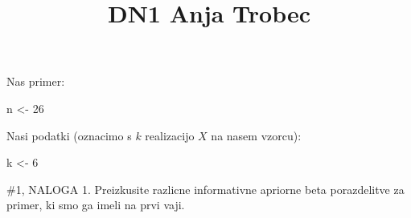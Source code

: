 \documentclass[
]{article}
\title{DN1 Anja Trobec}
\author{}
\date{\vspace{-2.5em}}
\newenvironment{Shaded}{\begin{snugshade}}{\end{snugshade}}
\newcommand{\DecValTok}[1]{\textcolor[rgb]{0.00,0.00,0.81}{#1}}
\newcommand{\NormalTok}[1]{#1}
\newcommand{\OtherTok}[1]{\textcolor[rgb]{0.56,0.35,0.01}{#1}}
\begin{document}
\maketitle

Nas primer:

\begin{Shaded}
\begin{Highlighting}[]
\NormalTok{n }\OtherTok{\textless{}{-}} \DecValTok{26}
\end{Highlighting}
\end{Shaded}

Nasi podatki (oznacimo s \(k\) realizacijo \(X\) na nasem vzorcu):

\begin{Shaded}
\begin{Highlighting}[]
\NormalTok{k }\OtherTok{\textless{}{-}} \DecValTok{6}
\end{Highlighting}
\end{Shaded}

\#1, NALOGA 1. Preizkusite razlicne informativne apriorne beta
porazdelitve za primer, ki smo ga imeli na prvi vaji.
\end{document}
